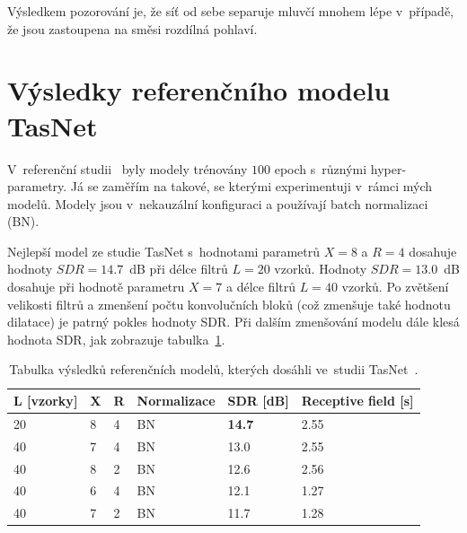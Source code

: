 Výsledkem pozorování je, že síť od sebe separuje mluvčí mnohem lépe v~případě, že jsou zastoupena na směsi rozdílná pohlaví.




\section{Výsledky referenčního modelu TasNet}
V~referenční studii~\cite{luo2018convtasnet} byly modely trénovány $100$ epoch s~různými hyper-parametry. Já se zaměřím na takové, se kterými experimentuji v~rámci mých modelů. Modely jsou v~nekauzální konfiguraci a používají batch normalizaci (BN).

Nejlepší model ze studie TasNet s~hodnotami parametrů $X=8$ a $R=4$ dosahuje hodnoty $SDR = 14.7$~dB při délce filtrů $L = 20$ vzorků. Hodnoty $SDR = 13.0$~dB dosahuje při hodnotě parametru $X = 7$ a délce filtrů $L = 40$ vzorků. Po zvětšení velikosti filtrů a zmenšení počtu konvolučních bloků (což zmenšuje také hodnotu dilatace) je patrný pokles hodnoty SDR. Při dalším zmenšování modelu dále klesá hodnota SDR, jak zobrazuje tabulka~\ref{tab:tasnet}.

\begin{table}[!htbp]
\centering
\caption{Tabulka výsledků referenčních modelů, kterých dosáhli ve~studii TasNet~\cite{luo2018convtasnet}.}
\label{tab:tasnet}
\begin{tabular}{|l|l|l|l|l|l|}
\hline
\textbf{L {[}vzorky{]}} & \textbf{X} & \textbf{R} & \textbf{Normalizace} & \textbf{SDR {[}dB{]}} & \textbf{Receptive field {[}s{]}} \\ \hline
20 & 8 & 4 & BN & \textbf{14.7} & 2.55 \\ \hline
40 & 7 & 4 & BN & 13.0 & 2.55 \\ \hline
40 & 8 & 2 & BN & 12.6 & 2.56 \\ \hline
40 & 6 & 4 & BN & 12.1 & 1.27 \\ \hline
40 & 7 & 2 & BN & 11.7 & 1.28 \\ \hline
\end{tabular}
\end{table}

